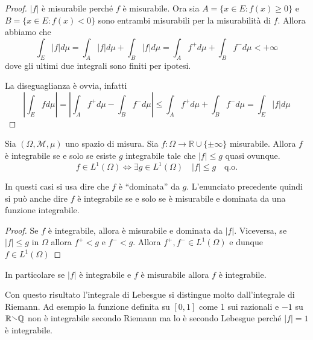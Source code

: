 \begin{proof}
    \(|f|\) è misurabile perché \(f\) è misurabile. Ora sia \(A = \{x \in E:
    f(x) \ge 0\} \) e \(B = \{x \in E : f(x) < 0\} \) sono entrambi misurabili
    per la misurabilità di \(f\). Allora abbiamo che
    \[
        \int_E |f| d\mu = \int_{A} |f| d\mu + \int_{B} |f| d\mu = \int_{A} f^{+}
        d\mu + \int_B f^{-} d\mu < +\infty
    \]
    dove gli ultimi due integrali sono finiti per ipotesi.

    La diseguaglianza è ovvia, infatti
    \[
        \left|\int_{E} f d\mu\right| =\left| \int_{A} f^{+} d\mu - \int_{B}
        f^{-} d\mu \right| \le \int_{A}
        f^{+}
        d\mu + \int_{B} f^{-} d\mu = \int_{E} |f| d\mu
    \]
\end{proof}
\begin{theorem}\label{th:cnes_L1}
    Sia \((\Omega, \mathcal{M}, \mu)\) uno spazio di misura. Sia \(f : \Omega
    \to  \mathbb{R}\cup \{\pm\infty\} \) misurabile. Allora \(f\) è integrabile
    se e solo se esiste \(g\) integrabile tale che \(|f| \le g\) quasi ovunque.
    \[
        f \in L^{1}(\Omega) \iff \exists g \in L^{1}(\Omega) \quad |f| \le g
        \quad \text{q.o.}
    \]
\end{theorem}
\begin{note}
    In questi casi si usa dire che \(f\) è  ``dominata'' da \(g\). L'enunciato
    precedente quindi si può anche dire \(f\) è integrabile se e solo se è
    misurabile e dominata da una funzione integrabile.
\end{note}
\begin{proof}
    Se \(f\)  è integrabile, allora è misurabile e dominata da
        \(|f|\). Viceversa, se
    \(|f| \le g\) in \(\Omega\) allora \(f^{+} < g\) e
        \(f^{-} < g\). Allora \(f^{+}, f^{-} \in L^{1}{(\Omega)}\) e dunque \(f
        \in L^{1}{(\Omega)}\)
\end{proof}
\begin{corollary}
    In particolare se \(|f|\) è integrabile e \(f\) è misurabile allora \(f\) è
    integrabile.
\end{corollary}
Con questo risultato l'integrale di Lebesgue si distingue molto dall'integrale
di Riemann. Ad esempio la funzione definita su \([0, 1]\) come 1 sui razionali e
\(-1\) su \(\mathbb{R}\sminus \mathbb{Q}\) non è integrabile secondo Riemann ma
lo è secondo Lebesgue perché \(|f| = 1\) è integrabile.

